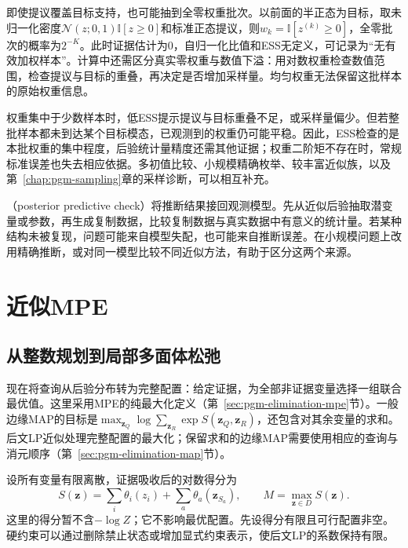 即使提议覆盖目标支持，也可能抽到全零权重批次。以前面的半正态为目标，取未归一化密度$\mathcal N(z;0,1)\mathbb I[z\geq0]$和标准正态提议，则$w_k=\mathbb I[z^{(k)}\geq0]$，全零批次的概率为$2^{-K}$。此时证据估计为$0$，自归一化比值和ESS无定义，可记录为“无有效加权样本”。计算中还需区分真实零权重与数值下溢：用对数权重检查数值范围，检查提议与目标的重叠，再决定是否增加采样量。均匀权重无法保留这批样本的原始权重信息。

权重集中于少数样本时，低ESS提示提议与目标重叠不足，或采样量偏少。但若整批样本都未到达某个目标模态，已观测到的权重仍可能平稳。因此，ESS检查的是本批权重的集中程度，后验统计量精度还需其他证据；权重二阶矩不存在时，常规标准误差也失去相应依据。多初值比较、小规模精确枚举、较丰富近似族，以及第~\ref{chap:pgm-sampling}章的采样诊断，可以相互补充。

（posterior predictive check）将推断结果接回观测模型。先从近似后验抽取潜变量或参数，再生成复制数据，比较复制数据与真实数据中有意义的统计量。若某种结构未被复现，问题可能来自模型失配，也可能来自推断误差。在小规模问题上改用精确推断，或对同一模型比较不同近似方法，有助于区分这两个来源。

\section{近似MPE}
\label{sec:pgm-variational-mpe}

\subsection{从整数规划到局部多面体松弛}
\label{sec:pgm-variational-ilp-local-polytope}
\label{sec:pgm-variational-lp}

现在将查询从后验分布转为完整配置：给定证据，为全部非证据变量选择一组联合最优值。这里采用MPE的纯最大化定义（第~\ref{sec:pgm-elimination-mpe}节）。一般边缘MAP的目标是$\max_{\bm z_Q}\log\sum_{\bm z_R}\exp S(\bm z_Q,\bm z_R)$，还包含对其余变量的求和。后文LP近似处理完整配置的最大化；保留求和的边缘MAP需要使用相应的查询与消元顺序（第~\ref{sec:pgm-elimination-map}节）。

设所有变量有限离散，证据吸收后的对数得分为
\begin{equation}
  S(\bm z)=\sum_i\theta_i(z_i)
              +\sum_a\theta_a(\bm z_{S_a}),
  \qquad M=\max_{\bm z\in D}S(\bm z).
  \label{eq:pgm-variational-mpe-score}
\end{equation}
这里的得分暂不含$-\log Z$；它不影响最优配置。先设得分有限且可行配置非空。硬约束可以通过删除禁止状态或增加显式约束表示，使后文LP的系数保持有限。


